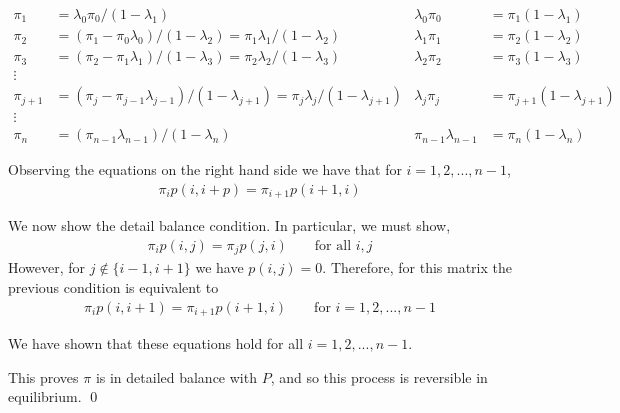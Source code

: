 \documentclass[10pt]{article}
\begin{document}
\begin{solution}[Solution]
\begin{align*}
    \pi_1 &= \lambda_0\pi_0 / (1-\lambda_1) 
        & \lambda_0\pi_0 &= \pi_1(1-\lambda_1) \\
    \pi_2 &= (\pi_1-\pi_0\lambda_0)/(1-\lambda_2) = \pi_1\lambda_1/(1-\lambda_2) 
        & \lambda_1\pi_1 &= \pi_2(1-\lambda_2) \\
    \pi_3 &= (\pi_2-\pi_1\lambda_1)/(1-\lambda_3) = \pi_2\lambda_2/(1-\lambda_3) 
        & \lambda_2\pi_2 &= \pi_3(1-\lambda_3) \\
    \vdots \\
    \pi_{j+1} &= (\pi_j-\pi_{j-1}\lambda_{j-1})/(1-\lambda_{j+1}) = \pi_j\lambda_j/(1-\lambda_{j+1}) & \lambda_j\pi_j &= \pi_{j+1}(1-\lambda_{j+1})\\
    \vdots \\
    \pi_n &= (\pi_{n-1}\lambda_{n-1})/(1-\lambda_n) 
        & \pi_{n-1}\lambda_{n-1} &= \pi_n(1-\lambda_n)
\end{align*}

Observing the equations on the right hand side we have that for \( i=1,2,...,n-1 \),
\begin{align*}
    \pi_{i}p(i,i+p) = \pi_{i+1}p(i+1,i)
\end{align*}

We now show the detail balance condition. In particular, we must show, 
\begin{align*}
    \pi_ip(i,j) = \pi_jp(j,i)  &&\text{ for all } i,j 
\end{align*}
However, for \( j\notin\{i-1,i+1\} \) we have \( p(i,j)=0 \). Therefore, for this matrix the previous condition is equivalent to 
\begin{align*}
    \pi_i p(i,i+1) = \pi_{i+1}p(i+1,i) &&\text{ for } i=1,2,..., n-1
\end{align*}

We have shown that these equations hold for all \( i=1,2,...,n-1 \). 

This proves \( \pi \) is in detailed balance with \( P \), and so this process is reversible in equilibrium. \qed

\end{solution}
\end{document}
